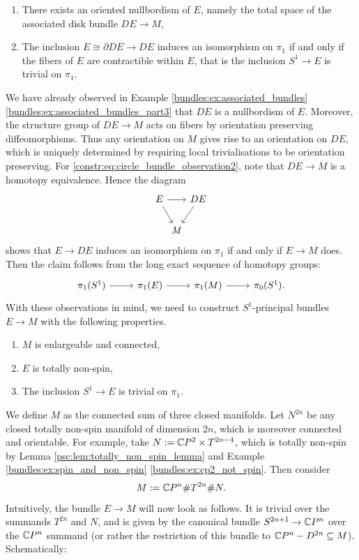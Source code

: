 \begin{enumerate}[label=(\roman*)]
	\item There exists an oriented nullbordism of $E$, namely the total space of the associated disk bundle $DE \to M$,
	\item \label{constr:eq:circle_bundle_observation2} The inclusion $E \cong \partial DE \to DE$ induces an isomorphism on $\pi_1$ if and only if the fibers of $E$ are contractible within $E$, that is the inclusion $S^1 \to E$ is trivial on $\pi_1$.
\end{enumerate}

We have already observed in Example \ref{bundles:ex:associated_bundles} \ref{bundles:ex:associated_bundles_part3} that $DE$ is a nullbordism of $E$. Moreover, the structure group of $DE \to M$ acts on fibers by orientation preserving diffeomorphisms. Thus any orientation on $M$ gives rise to an orientation on $DE$, which is uniquely determined by requiring local trivialisations to be orientation preserving. For \ref{constr:eq:circle_bundle_observation2}, note that $DE \to M$ is a homotopy equivalence. Hence the diagram 
\[\begin{tikzcd}[column sep=0cm]
	E && DE \\
	& M
	\arrow[from=1-1, to=1-3]
	\arrow[from=1-1, to=2-2]
	\arrow[from=1-3, to=2-2]
\end{tikzcd}\]
shows that $E \to DE$ induces an isomorphism on $\pi_1$ if and only if $E \to M$ does. Then the claim follows from the long exact sequence of homotopy groups:
\[\begin{tikzcd}
	{\pi_1(S^1)} & {\pi_1(E)} & {\pi_1(M)} & {\pi_0(S^1).}
	\arrow[from=1-1, to=1-2]
	\arrow[from=1-2, to=1-3]
	\arrow[from=1-3, to=1-4]
\end{tikzcd}\]
With these observations in mind, we need to construct $S^1$-principal bundles $E \to M$ with the following properties.

\begin{enumerate}[label = (\Roman*)]
	\item \label{constr:property1} $M$ is enlargeable and connected,
	\item \label{constr:property2} $E$ is totally non-spin,
	\item \label{constr:property3} The inclusion $S^1 \to E$ is trivial on $\pi_1$.
\end{enumerate}

We define $M$ as the connected sum of three closed manifolds. Let $N^{2n}$ be any closed totally non-spin manifold of dimension $2n$, which is moreover connected and orientable. For example, take $N:= \mathbb{C} P^2 \times T^{2n-4}$, which is totally non-spin by Lemma \ref{psc:lem:totally_non_spin_lemma} and Example \ref{bundles:ex:spin_and_non_spin} \ref{bundles:ex:cp2_not_spin}. Then consider
\[
M := \mathbb{C} P^n \# T^{2n} \# N.
\] 
Intuitively, the bundle $E \to M$ will now look as follows. It is trivial over the summands $T^{2n}$ and $N$, and is given by the canonical bundle $S^{2n+1} \to \mathbb{C} P^n$ over the $\mathbb{C} P^n$ summand (or rather the restriction of this bundle to $\mathbb{C} P^n - D^{2n} \subseteq M$). Schematically:

